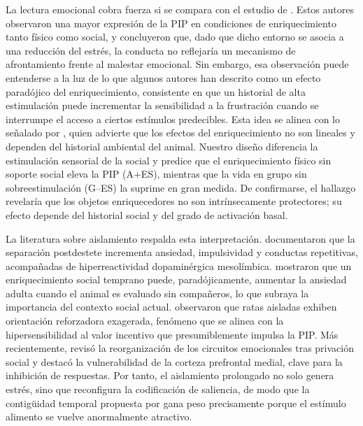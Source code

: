 \documentclass[12pt,a4paper]{article}
\begin{document}
\begin{multicols}{2}
La lectura emocional cobra fuerza si se compara con el estudio de \citet{FuentesVerdugo2023}. Estos autores observaron una mayor expresión de la PIP en condiciones de enriquecimiento tanto físico como social, y concluyeron que, dado que dicho entorno se asocia a una reducción del estrés, la conducta no reflejaría un mecanismo de afrontamiento frente al malestar emocional. Sin embargo, esa observación puede entenderse a la luz de lo que algunos autores han descrito como un efecto paradójico del enriquecimiento, consistente en que un historial de alta estimulación puede incrementar la sensibilidad a la frustración cuando se interrumpe el acceso a ciertos estímulos predecibles. Esta idea se alinea con lo señalado por \citet{Wurbel2001}, quien advierte que los efectos del enriquecimiento no son lineales y dependen del historial ambiental del animal. Nuestro diseño diferencia la estimulación sensorial de la social y predice que el enriquecimiento físico sin soporte social eleva la PIP (A+ES), mientras que la vida en grupo sin sobreestimulación (G--ES) la suprime en gran medida. De confirmarse, el hallazgo revelaría que los objetos enriquecedores no son intrínsecamente protectores; su efecto depende del historial social y del grado de activación basal.

La literatura sobre aislamiento respalda esta interpretación. \citet{Fone2008} documentaron que la separación postdestete incrementa ansiedad, impulsividad y conductas repetitivas, acompañadas de hiperreactividad dopaminérgica mesolímbica. \citet{Branchi2006} mostraron que un enriquecimiento social temprano puede, paradójicamente, aumentar la ansiedad adulta cuando el animal es evaluado sin compañeros, lo que subraya la importancia del contexto social actual. \citet{Robbins1989} observaron que ratas aisladas exhiben orientación reforzadora exagerada, fenómeno que se alinea con la hipersensibilidad al valor incentivo que presumiblemente impulsa la PIP. Más recientemente, \citet{Arakawa2018} revisó la reorganización de los circuitos emocionales tras privación social y destacó la vulnerabilidad de la corteza prefrontal medial, clave para la inhibición de respuestas. Por tanto, el aislamiento prolongado no solo genera estrés, sino que reconfigura la codificación de saliencia, de modo que la contigüidad temporal propuesta por \citet{Killeen2013} gana peso precisamente porque el estímulo alimento se vuelve anormalmente atractivo.


\end{multicols}
\end{document}
